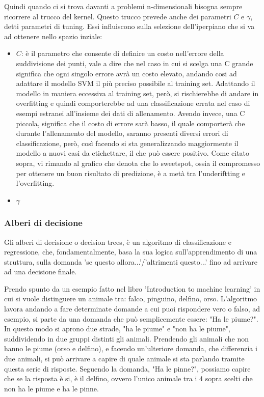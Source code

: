 \documentclass[12pt,italian]{report}
\begin{document}
Quindi quando ci si trova davanti a problemi n-dimensionali bisogna sempre ricorrere al trucco del kernel. Questo trucco prevede anche dei parametri $ C $ e $ \gamma $, detti parametri di tuning.
Essi influiscono sulla selezione dell'iperpiano che si va ad ottenere nello spazio inziale:
\begin{itemize}
	\item $C$: è il parametro che consente di definire un costo nell'errore della suddivisione dei punti, vale a dire che nel caso in cui si scelga una C grande significa che ogni singolo errore avrà un costo elevato, andando cosi ad adattare il modello SVM il più preciso possibile al training set. Adattando il modello in maniera eccessiva al training set, però, si rischierebbe di andare in overfitting e quindi comporterebbe ad una classificazione errata nel caso di esempi estranei all'insieme dei dati di allenamento. Avendo invece, una C piccola, significa che il costo di errore sarà basso, il quale comporterà che durante l'allenamento del modello, saranno presenti diversi errori di classificazione, però, così facendo si sta generalizzando maggiormente il modello a nuovi casi da etichettare, il che può essere positivo. Come citato sopra, vi rimando al grafico che denota che lo sweetspot, ossia il compromesso per ottenere un buon risultato di predizione, è a metà tra l'underiftting e l'overfitting.
	
	\item $\gamma$
\end{itemize}


\pagebreak

\subsubsection{Alberi di decisione}

Gli alberi di decisione o decision trees, è un algoritmo di classificazione e regressione, che, fondamentalmente, basa la sua logica sull'apprendimento di una struttura, sulla domanda 'se questo allora...'/'altrimenti questo...' fino ad arrivare ad una decisione finale.

Prendo spunto da un esempio fatto nel libro 'Introduction to machine learning' in cui si vuole distinguere un animale tra: falco, pinguino, delfino, orso.
L'algoritmo lavora andando a fare determinate domande a cui puoi rispondere vero o falso, ad esempio, si parte da una domanda che può semplicemente essere: "Ha le piume?". In questo modo si aprono due strade, "ha le piume" e "non ha le piume", suddividendo in due gruppi distinti gli animali. Prendendo gli animali che non hanno le piume (orso e delfino), e facendo un'ulteriore domanda, che differenzia i due animali, si può arrivare a capire di quale animale si sta parlando tramite questa serie di risposte. Seguendo la domanda, "Ha le pinne?", possiamo capire che se la risposta è si, è il delfino, ovvero l'unico animale tra i 4 sopra scelti che non ha le piume e ha le pinne.
\end{document}
